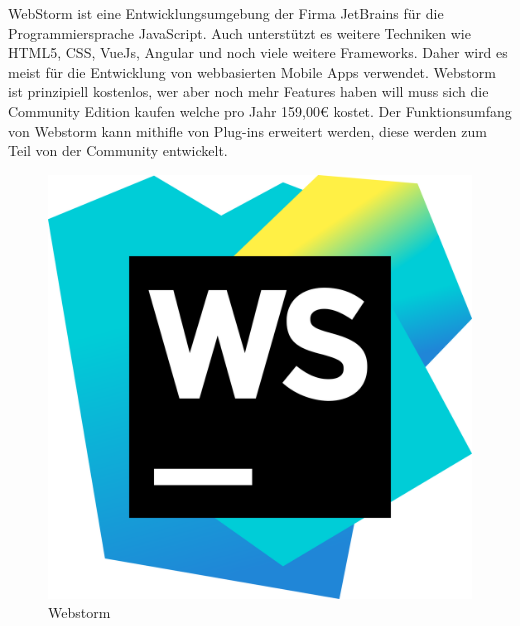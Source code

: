 WebStorm ist eine Entwicklungsumgebung der Firma JetBrains für die Programmiersprache JavaScript. Auch unterstützt es weitere Techniken wie HTML5, CSS, VueJs, Angular und noch viele weitere Frameworks. Daher wird es meist für die Entwicklung von webbasierten Mobile Apps verwendet.
Webstorm ist prinzipiell kostenlos, wer aber noch mehr Features haben will muss sich die Community Edition kaufen welche pro Jahr 159,00€ kostet.
Der Funktionsumfang von Webstorm kann mithifle von Plug-ins erweitert werden, diese werden zum Teil von der Community entwickelt.

\begin{figure}[h!]
    \centering
    \includegraphics[width=0.3\linewidth]{pics/WebStorm_Icon.png}
    \caption{Webstorm}
    \label{fig:enter-label}
\end{figure}

\cite{Webstorm}



